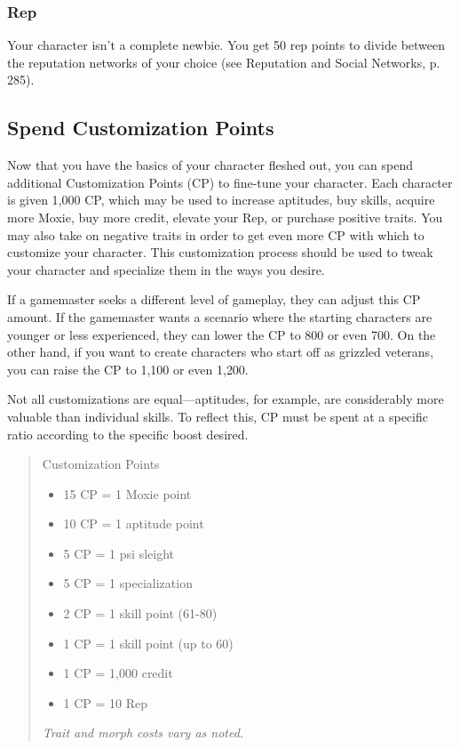 \subsubsection{Rep}
Your character isn’t a complete newbie. You get 50 rep points to divide between
the reputation networks of your choice (see Reputation and Social Networks,
p. 285).

\subsection{Spend Customization Points} 
Now that you have the basics of your character fleshed out, you can spend
additional Customization Points (CP) to fine-tune your character. Each
character is given 1,000 CP, which may be used to increase aptitudes, buy
skills, acquire more Moxie, buy more credit, elevate your Rep, or purchase
positive traits. You may also take on negative traits in order to get even
more CP with which to customize your character. This customization process
should be used to tweak your character and specialize them in the ways you
desire.

If a gamemaster seeks a different level of gameplay, they can adjust this CP
amount. If the gamemaster wants a scenario where the starting characters are
younger or less experienced, they can lower the CP to 800 or even 700. On the
other hand, if you want to create characters who start off as grizzled
veterans, you can raise the CP to 1,100 or even 1,200.

Not all customizations are equal—aptitudes, for example, are considerably
more valuable than individual skills. To reflect this, CP must be spent at a
specific ratio according to the specific boost desired.

\begin{quotation}
  Customization Points
  \begin{itemize}
  \item 15 CP = 1 Moxie point
  \item 10 CP = 1 aptitude point
  \item 5 CP = 1 psi sleight
  \item 5 CP = 1 specialization
  \item 2 CP = 1 skill point (61-80)
  \item 1 CP = 1 skill point (up to 60)
  \item 1 CP = 1,000 credit
  \item 1 CP = 10 Rep
\end{itemize}
\textit{Trait and morph costs vary as noted.}
\end{quotation}


